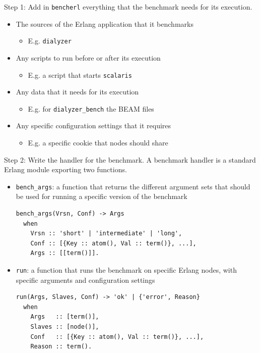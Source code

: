 \documentclass{beamer}
\begin{document}
\begin{frame}[t]{Step 1: Add in \texttt{bencherl} everything that the benchmark needs for its execution.}
	\begin{itemize}
		\item The sources of the \textcolor{burgundy}{Erlang application} that it benchmarks
			\begin{itemize}
				\item E.g. \texttt{dialyzer}
			\end{itemize}
		\item Any \textcolor{burgundy}{scripts} to run \textcolor{burgundy}{before} or \textcolor{burgundy}{after} its execution
            \begin{itemize}
                \item E.g. a script that starts \texttt{scalaris}
            \end{itemize}
		\item Any \textcolor{burgundy}{data} that it needs for its execution
            \begin{itemize}
                \item E.g. for \texttt{dialyzer\_bench} the BEAM files
            \end{itemize}
		\item Any specific \textcolor{burgundy}{configuration settings} that it requires
            \begin{itemize}
                \item E.g. a specific cookie that nodes should share
            \end{itemize}
	\end{itemize}
\end{frame}

\begin{frame}[fragile]{Step 2: Write the handler for the benchmark.}
	A \textcolor{burgundy}{benchmark handler} is a standard Erlang module exporting two functions.
\begin{itemize}
%
\item
%
	\textcolor{burgundy}{\texttt{bench\_args}}: a function that returns the different argument sets that should be used for running a specific version of the benchmark
%
        \medskip
	\begingroup\footnotesize
	\begin{verbatim}
bench_args(Vrsn, Conf) -> Args
  when
    Vrsn :: 'short' | 'intermediate' | 'long',
    Conf :: [{Key :: atom(), Val :: term()}, ...],
    Args :: [[term()]].
	\end{verbatim}
	\endgroup
        \medskip
%
\item
%
	\textcolor{burgundy}{\texttt{run}}: a function that runs the benchmark on specific Erlang nodes, with specific arguments and configuration settings
%
        \medskip
	\begingroup\footnotesize
        \begin{verbatim}
run(Args, Slaves, Conf) -> 'ok' | {'error', Reason}
  when
    Args   :: [term()],
    Slaves :: [node()],
    Conf   :: [{Key :: atom(), Val :: term()}, ...],
    Reason :: term().
	\end{verbatim}
	\endgroup
        \medskip
%
\end{itemize}
\end{frame}
\end{document}
